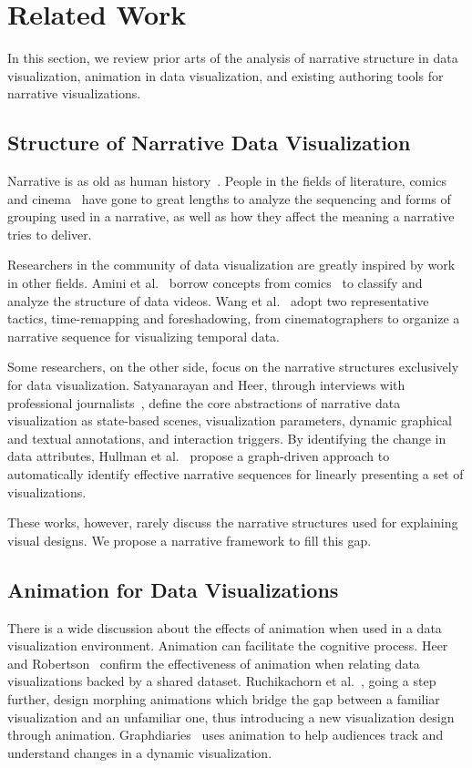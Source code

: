 \section {Related Work}
In this section, we review prior arts of the analysis of narrative structure in data visualization, animation in data visualization, and existing authoring tools for narrative visualizations.

\subsection{Structure of Narrative Data Visualization}
Narrative is as old as human history~\cite{cunningham_culture_2009}.  People in the fields of literature, comics~\cite{cohn_visual_2013} and cinema~\cite{schmidt_living_2017} have gone to great lengths to analyze the sequencing and forms of grouping used in a narrative, as well as how they affect the meaning a narrative tries to deliver. 

Researchers in the community of data visualization are greatly inspired by work in other fields.
Amini et al.~\cite{amini_understanding_2015} borrow concepts from comics~\cite{cohn_visual_2013} to classify and analyze the structure of data videos. Wang et al.~\cite{wang_animated_2016} adopt two representative tactics, time-remapping and foreshadowing, from cinematographers to organize a narrative sequence for visualizing temporal data. 

Some researchers, on the other side, focus on the narrative structures exclusively for data visualization. 
Satyanarayan and Heer, through interviews with professional journalists~\cite{satyanarayan_authoring_2014}, define the core abstractions of narrative data visualization as state-based scenes, visualization parameters, dynamic graphical and textual annotations, and interaction triggers. By identifying the change in data attributes, Hullman et al.~\cite{hullman_deeper_2013} propose a graph-driven approach to automatically identify effective narrative sequences for linearly presenting a set of visualizations. 

These works, however, rarely discuss the narrative structures used for explaining visual designs. We propose a narrative framework to fill this gap.

\subsection{Animation for Data Visualizations}
There is a wide discussion about the effects of animation when used in a data visualization environment.
Animation can facilitate the cognitive process. Heer and Robertson~\cite{heer_animated_2007-1} confirm the effectiveness of animation when relating data visualizations backed by a shared dataset. Ruchikachorn et al.~\cite{ruchikachorn_learning_2015}, going a step further, design morphing animations which bridge the gap between a familiar visualization and an unfamiliar one, thus introducing a new visualization design through animation. Graphdiaries~\cite{bach_graphdiaries:_2014} uses animation to help audiences track and understand changes in a dynamic visualization. 

